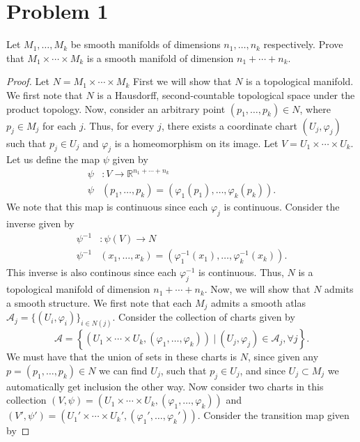 \documentclass[a4paper]{article}
\begin{document}
\section*{Problem 1}%
\label{sec:Problem 1}

Let $M_1, \dots, M_k$ be smooth manifolds of dimensions $n_1, \dots, n_k$ respectively. Prove that $M_1 \times \cdots \times M_k$ is a smooth manifold of dimension $n_1 + \cdots + n_k$.

\begin{proof}
  Let $N = M_1 \times \cdots \times M_k$ First we will show that $N$ is a topological manifold. We first note that $N$ is a Hausdorff, second-countable topological space under the product topology. Now, consider an arbitrary point $(p_1, \dots, p_k) \in N$, where $p_j \in M_j$ for each $j$. Thus, for every $j$, there exists a coordinate chart $(U_j, \varphi_j)$ such that $p_j \in U_j$ and $\varphi_j$ is a homeomorphism on its image. Let $V = U_1 \times \cdots \times U_k$. Let us define the map $\psi$ given by
  \[
    \begin{aligned}
      \psi&: V \rightarrow \mathds{R}^{n_1 + \cdots + n_k} \\
      \psi&(p_1, \dots, p_k) = (\varphi_1(p_1), \dots, \varphi_k(p_k)).
    \end{aligned}
  \]
  We note that this map is continuous since each $\varphi_j$ is continuous. Consider the inverse given by
  \[
    \begin{aligned}
      \psi^{-1}&: \psi(V) \rightarrow N \\
      \psi^{-1}&(x_1, \dots, x_k) = (\varphi^{-1}_1(x_1), \dots, \varphi^{-1}_k(x_k)).
    \end{aligned}
  \]
  This inverse is also continous since each $\varphi_j^{-1}$ is continuous. Thus, $N$ is a topological manifold of dimension $n_1 + \cdots + n_k$. Now, we will show that $N$ admits a smooth structure. We first note that each $M_j$ admits a smooth atlas $\mathcal{A}_j = \{(U_i, \varphi_i)\}_{i \in N(j)}$. Consider the collection of charts given by
  \[
    \mathcal{A} = \left\{ (U_1 \times \cdots \times U_k, (\varphi_1, \dots, \varphi_k))\ |\ (U_j, \varphi_j) \in  \mathcal{A}_j, \forall j\right\}.
  \]
  We must have that the union of sets in these charts is $N$, since given any $p = (p_1, \dots, p_k) \in N$ we can find $U_j$, such that $p_j \in U_j$, and since $U_j \subset M_j$ we automatically get inclusion the other way. Now consider two charts in this collection $(V, \psi) = (U_1 \times \cdots \times U_k, (\varphi_1, \dots, \varphi_k))$ and $(V', \psi') = (U_1' \times \cdots \times U_k', (\varphi_1', \dots, \varphi_k'))$. Consider the transition map given by

\end{proof}
\end{document}

